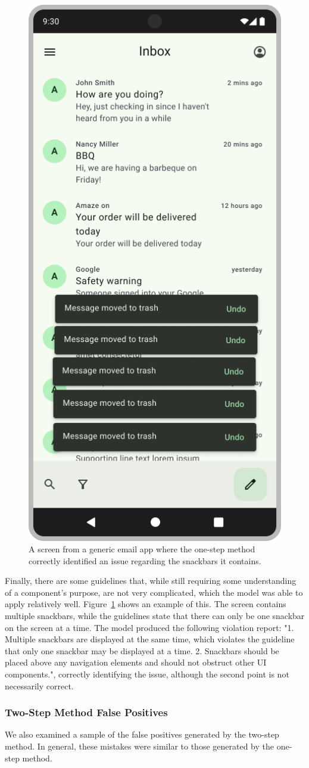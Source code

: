 \documentclass[11pt,titlepage,oneside,openany]{book}
\begin{document}
\begin{figure}[H]
	\centering
	\includegraphics[width=.28\textwidth]{figures/tp_ex_os_3.jpg}
	\caption{A screen from a generic email app where the one-step method correctly identified an issue regarding the snackbars it contains.}
	\label{fig:tp_ex_os_3}
\end{figure}

Finally, there are some guidelines that, while still requiring some understanding of a component's purpose, are not very complicated, which the model was able to apply relatively well. Figure~\ref{fig:tp_ex_os_3} shows an example of this. The screen contains multiple snackbars, while the guidelines state that there can only be one snackbar on the screen at a time. The model produced the following violation report: "1. Multiple snackbars are displayed at the same time, which violates the guideline that only one snackbar may be displayed at a time. 2. Snackbars should be placed above any navigation elements and should not obstruct other UI components.", correctly identifying the issue, although the second point is not necessarily correct.

\subsubsection{Two-Step Method False Positives}

We also examined a sample of the false positives generated by the two-step method. In general, these mistakes were similar to those generated by the one-step method.
\end{document}
